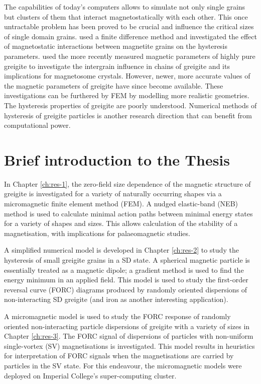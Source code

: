 The capabilities of today's computers allows to simulate not only single grains but clusters of them that interact magnetostatically with each other. This once untractable problem has been proved to be crucial and influence the critical sizes of single domain grains. \citet{Muxworthy2003,Muxworthy2004,Muxworthy2006} used a finite difference method and investigated the effect of magnetostatic interactions between magnetite grains on the hysteresis parameters. \citet{Muxworthy2013} used the more recently measured \citep{Chang2008} magnetic parameters of highly pure greigite to investigate the intergrain influence in chains of greigite and its implications for magnetosome crystals. However, newer, more accurate values of the magnetic parameters of greigite \citep{Li2014} have since become available. These investigations can be furthered by FEM by modelling more realistic geometries. The hysteresis properties of greigite are poorly understood. Numerical methods of hysteresis of greigite particles is another research direction that can benefit from computational power.\par

\section{Brief introduction to the Thesis}
In Chapter \ref{ch:res-1}, the zero-field size dependence of the magnetic structure of greigite is investigated for a variety of naturally occurring shapes via a micromagnetic finite element method (FEM). A nudged elastic-band (NEB) method is used to calculate minimal action paths between minimal energy states for a variety of shapes and sizes. This allows calculation of the stability of a magnetisation, with implications for palaeomagnetic studies.\par

A simplified numerical model is developed in Chapter \ref{ch:res-2} to study the hysteresis of small greigite grains in a SD state. A spherical magnetic particle is essentially treated as a magnetic dipole; a gradient method is used to find the energy minimum in an applied field. This model is used to study the first-order reversal curve (FORC) diagrams produced by randomly oriented dispersions of non-interacting SD greigite (and iron as another interesting application).\par

A micromagnetic model is used to study the FORC response of randomly oriented non-interacting particle dispersions of greigite with a variety of sizes in Chapter \ref{ch:res-3}. The FORC signal of dispersions of particles with non-uniform single-vortex (SV) magnetisations is investigated. This model results in heuristics for interpretation of FORC signals when the magnetisations are carried by particles in the SV state. For this endeavour, the micromagnetic models were deployed on Imperial College's super-computing cluster.\par

